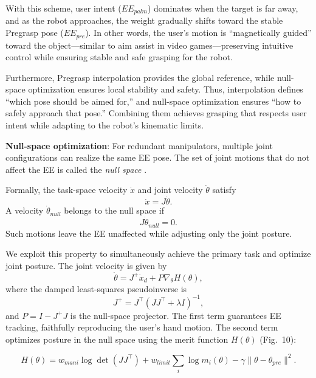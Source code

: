 \documentclass[../../main.tex]{subfiles} %
\begin{document}
With this scheme, user intent ($EE_{palm}$) dominates when the target is far away, and as the robot approaches, 
the weight gradually shifts toward the stable Pregrasp pose ($EE_{pre}$).  
In other words, the user’s motion is “magnetically guided” toward the 
object—similar to aim assist in video games—preserving 
intuitive control while ensuring stable and safe grasping for the robot.

Furthermore, Pregrasp interpolation provides the global reference, 
while null-space optimization ensures local stability and safety.  
Thus, interpolation defines “which pose should be aimed for,” 
and null-space optimization ensures “how to safely approach that pose.”  
Combining them achieves grasping that respects user intent while adapting to the robot’s kinematic limits.  

\medskip
\textbf{Null-space optimization}:  
For redundant manipulators, multiple joint configurations can realize the same EE pose.  
The set of joint motions that do not affect the EE is called the \textit{null space} \cite{}.  

Formally, the task-space velocity $\dot{x}$ and joint velocity $\dot{\theta}$ satisfy
\begin{equation}
\dot{x} = J \dot{\theta}.
\end{equation}
A velocity $\dot{\theta}_{null}$ belongs to the null space if
\begin{equation}
J \dot{\theta}_{null} = 0.
\end{equation}
Such motions leave the EE unaffected while adjusting only the joint posture.

We exploit this property to simultaneously achieve the primary task and optimize joint posture.  
The joint velocity is given by
\begin{equation}
\dot{\theta} = J^+ \dot{x}_d + P \nabla_\theta H(\theta),
\end{equation}
where the damped least-squares pseudoinverse is
\begin{equation}
J^+ = J^\top (JJ^\top + \lambda I)^{-1},
\end{equation}
and $P = I - J^+ J$ is the null-space projector.  
The first term guarantees EE tracking, faithfully reproducing the user’s hand motion.  
The second term optimizes posture in the null space using the merit function $H(\theta)$ (Fig.~10):

\begin{equation}
H(\theta) = w_{mani}\log\det(JJ^\top) + w_{limit}\sum_i \log m_i(\theta) - \gamma\|\theta-\theta_{pre}\|^2.
\end{equation}
\end{document}
